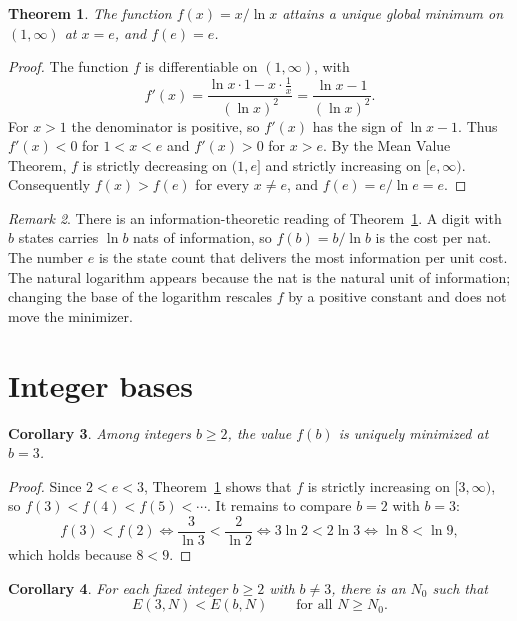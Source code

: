 \documentclass[11pt]{amsart}
\newtheorem{theorem}{Theorem}[section]
\newtheorem{corollary}[theorem]{Corollary}
\theoremstyle{definition}
\theoremstyle{remark}
\newtheorem{remark}[theorem]{Remark}
\numberwithin{equation}{section}
\begin{document}
\begin{theorem}\label{thm:e}
The function $f(x)=x/\ln x$ attains a unique global minimum on $(1,\infty)$
at $x=e$, and $f(e)=e$.
\end{theorem}

\begin{proof}
The function $f$ is differentiable on $(1,\infty)$, with
\[
  f'(x) = \frac{\ln x \cdot 1 - x\cdot \tfrac{1}{x}}{(\ln x)^2}
        = \frac{\ln x - 1}{(\ln x)^2}.
\]
For $x>1$ the denominator is positive, so $f'(x)$ has the sign of
$\ln x - 1$. Thus $f'(x)<0$ for $1<x<e$ and $f'(x)>0$ for $x>e$. By the Mean
Value Theorem, $f$ is strictly decreasing on $(1,e]$ and strictly increasing
on $[e,\infty)$. Consequently $f(x)>f(e)$ for every $x\neq e$, and
$f(e)=e/\ln e = e$.
\end{proof}

\begin{remark}
There is an information-theoretic reading of Theorem~\ref{thm:e}. A digit
with $b$ states carries $\ln b$ nats of information, so $f(b)=b/\ln b$ is the
cost per nat. The number $e$ is the state count that delivers the most
information per unit cost. The natural logarithm appears because the nat is
the natural unit of information; changing the base of the logarithm rescales
$f$ by a positive constant and does not move the minimizer.
\end{remark}

\section{Integer bases}

\begin{corollary}\label{cor:three}
Among integers $b\ge 2$, the value $f(b)$ is uniquely minimized at $b=3$.
\end{corollary}

\begin{proof}
Since $2<e<3$, Theorem~\ref{thm:e} shows that $f$ is strictly increasing on
$[3,\infty)$, so $f(3)<f(4)<f(5)<\cdots$. It remains to compare $b=2$ with
$b=3$:
\[
  f(3)<f(2)
  \iff \frac{3}{\ln 3} < \frac{2}{\ln 2}
  \iff 3\ln 2 < 2\ln 3
  \iff \ln 8 < \ln 9,
\]
which holds because $8<9$.
\end{proof}

\begin{corollary}\label{cor:eventual}
For each fixed integer $b\ge 2$ with $b\neq 3$, there is an $N_0$ such that
\[
  E(3,N) < E(b,N) \qquad\text{for all } N\ge N_0 .
\]
\end{corollary}
\end{document}
